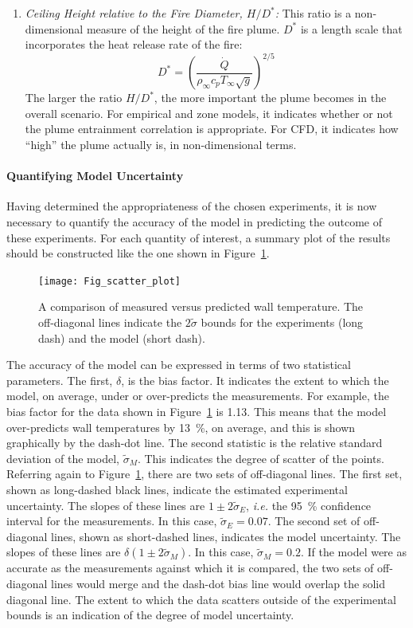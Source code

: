 \documentclass[graybox]{svmult}
\begin{document}
\begin{enumerate}
\item {\em Ceiling Height relative to the Fire Diameter, $H/D^*$:}
This ratio is a non-dimensional measure of the height of the fire plume.
$D^*$ is a length scale that incorporates the heat release rate of the fire:
\begin{equation}
   D^* = \left( \frac{\dot{Q}}{\rho_\infty c_p T_\infty \sqrt{g}} \right)^{2/5} \label{Dstar}
\end{equation}
The larger the ratio $H/D^*$, the more important the plume becomes in the overall scenario. For empirical and zone models, it indicates whether or not the plume entrainment correlation is appropriate. For CFD, it indicates how ``high'' the plume actually is, in non-dimensional terms.
\end{enumerate}


\paragraph{Quantifying Model Uncertainty}

Having determined the appropriateness of the chosen experiments, it is now necessary to quantify the accuracy of the model in predicting the outcome of these experiments. For each quantity of interest, a summary plot of the results should be constructed like the one shown in Figure~\ref{scatterplot}.
\begin{figure}[ht]
\texttt{[image: Fig\_scatter\_plot]}
\caption{A comparison of measured versus predicted wall temperature. The off-diagonal lines indicate the $2 \widetilde{\sigma}$ bounds for the experiments (long dash) and the model (short dash).}
\label{scatterplot}
\end{figure}
The accuracy of the model can be expressed in terms of two statistical parameters. The first, $\delta$, is the bias factor. It indicates the extent to which the model, on average, under or over-predicts the measurements. For example, the bias factor for the data shown in Figure~\ref{scatterplot} is 1.13. This means that the model over-predicts wall temperatures by 13~\%, on average, and this is shown graphically by the dash-dot line. The second statistic is the relative standard deviation of the model, $\widetilde{\sigma}_M$. This indicates the degree of scatter of the points. Referring again to Figure~\ref{scatterplot}, there are two sets of off-diagonal lines. The first set, shown as long-dashed black lines, indicate the estimated experimental uncertainty. The slopes of these lines are $1\pm 2 \widetilde{\sigma}_E$, {\em i.e.} the 95~\% confidence interval for the measurements. In this case, $\widetilde{\sigma}_E=0.07$. The second set of off-diagonal lines, shown as short-dashed lines, indicates the model uncertainty. The slopes of these lines are $\delta (1\pm 2 \widetilde{\sigma}_M)$. In this case, $\widetilde{\sigma}_M=0.2$. If the model were as accurate as the measurements against which it is compared, the two sets of off-diagonal lines would merge and the dash-dot bias line would overlap the solid diagonal line. The extent to which the data scatters outside of the experimental bounds is an indication of the degree of model uncertainty.
\end{document}

